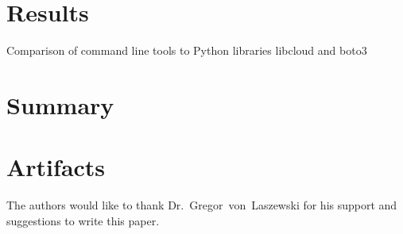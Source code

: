 \section{Results}

Comparison of command line tools to Python libraries libcloud and boto3

\section{Summary}

\section{Artifacts}

\begin{acks}

  The authors would like to thank Dr.~Gregor~von~Laszewski for his
  support and suggestions to write this paper.

\end{acks}


 

